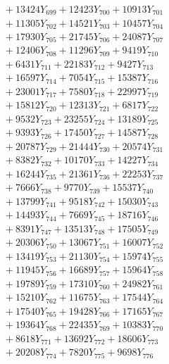 \documentclass[a4paper,10pt]{article}
\begin{document}
{\begin{align}
&\;  + 13424 Y_{699} + 12423 Y_{700} + 10913 Y_{701} \\[0.3ex]
&\;  + 11305 Y_{702} + 14521 Y_{703} + 10457 Y_{704} \\[0.3ex]
&\;  + 17930 Y_{705} + 21745 Y_{706} + 24087 Y_{707} \\[0.3ex]
&\;  + 12406 Y_{708} + 11296 Y_{709} + 9419 Y_{710} \\[0.3ex]
&\;  + 6431 Y_{711} + 22183 Y_{712} + 9427 Y_{713} \\[0.3ex]
&\;  + 16597 Y_{714} + 7054 Y_{715} + 15387 Y_{716} \\[0.3ex]
&\;  + 23001 Y_{717} + 7580 Y_{718} + 22997 Y_{719} \\[0.5ex]\allowbreak
&\;  + 15812 Y_{720} + 12313 Y_{721} + 6817 Y_{722} \\[0.3ex]
&\;  + 9532 Y_{723} + 23255 Y_{724} + 13189 Y_{725} \\[0.3ex]
&\;  + 9393 Y_{726} + 17450 Y_{727} + 14587 Y_{728} \\[0.3ex]
&\;  + 20787 Y_{729} + 21444 Y_{730} + 20574 Y_{731} \\[0.3ex]
&\;  + 8382 Y_{732} + 10170 Y_{733} + 14227 Y_{734} \\[0.3ex]
&\;  + 16244 Y_{735} + 21361 Y_{736} + 22253 Y_{737} \\[0.3ex]
&\;  + 7666 Y_{738} + 9770 Y_{739} + 15537 Y_{740} \\[0.3ex]
&\;  + 13799 Y_{741} + 9518 Y_{742} + 15030 Y_{743} \\[0.3ex]
&\;  + 14493 Y_{744} + 7669 Y_{745} + 18716 Y_{746} \\[0.3ex]
&\;  + 8391 Y_{747} + 13513 Y_{748} + 17505 Y_{749} \\[0.5ex]\allowbreak
&\;  + 20306 Y_{750} + 13067 Y_{751} + 16007 Y_{752} \\[0.3ex]
&\;  + 13419 Y_{753} + 21130 Y_{754} + 15974 Y_{755} \\[0.3ex]
&\;  + 11945 Y_{756} + 16689 Y_{757} + 15964 Y_{758} \\[0.3ex]
&\;  + 19789 Y_{759} + 17310 Y_{760} + 24982 Y_{761} \\[0.3ex]
&\;  + 15210 Y_{762} + 11675 Y_{763} + 17544 Y_{764} \\[0.3ex]
&\;  + 17540 Y_{765} + 19428 Y_{766} + 17165 Y_{767} \\[0.3ex]
&\;  + 19364 Y_{768} + 22435 Y_{769} + 10383 Y_{770} \\[0.3ex]
&\;  + 8618 Y_{771} + 13692 Y_{772} + 18606 Y_{773} \\[0.3ex]
&\;  + 20208 Y_{774} + 7820 Y_{775} + 9698 Y_{776} \\[0.3ex]

\end{align}}
\end{document}
